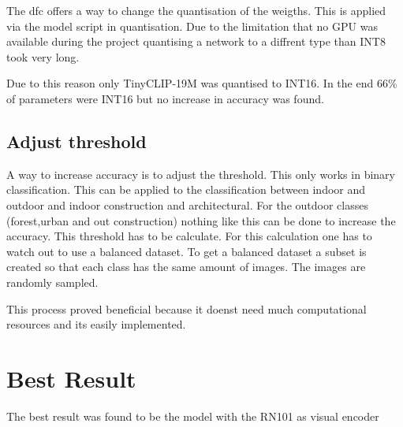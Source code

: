 The \acrshort{dfc} offers a way to change the quantisation of the weigths.
This is applied via the model script in quantisation.
Due to the limitation that no GPU was available during the project quantising a network to a diffrent type than INT8 took very long.

Due to this reason only TinyCLIP-19M was quantised to INT16.
In the end 66\% of parameters were INT16  but no increase in accuracy was found.


\subsection{Adjust threshold}

A way to increase accuracy is to adjust the threshold.
This only works in binary classification.
This can be applied to the classification between indoor and outdoor and indoor construction and architectural.
For the outdoor classes (forest,urban and out construction) nothing like this can be done to increase the accuracy.
This threshold has to be calculate.
For this calculation one has to watch out to use a balanced dataset.
To get a balanced dataset a subset is created so that each class has the same amount of images.
The images are randomly sampled.

This process proved beneficial because it doenst need much computational resources and its easily implemented.

\section{Best Result}

The best result was found to be the model with the RN101 as visual encoder